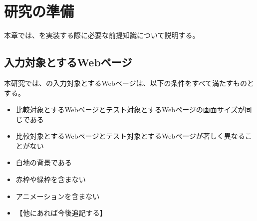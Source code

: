\chapter{研究の準備}\label{cha:Preparation}
本章では、\toolName を実装する際に必要な前提知識について説明する。

\section{入力対象とするWebページ}\label{sec:target_images}
本研究では、\toolName の入力対象とするWebページは、以下の条件をすべて満たすものとする。
\begin{itemize}
      \setlength{\itemsep}{0pt}
            \setlength{\parsep}{0pt}
      \item 比較対象とするWebページとテスト対象とするWebページの画面サイズが同じである
      \item 比較対象とするWebページとテスト対象とするWebページが著しく異なることがない
      \item 白地の背景である
      \item 赤枠や緑枠を含まない
      \item アニメーションを含まない
      \item 【他にあれば今後追記する】
\end{itemize}

